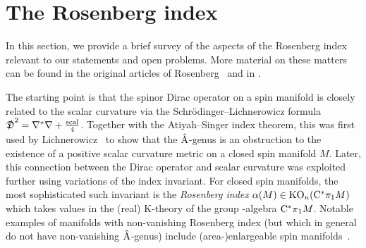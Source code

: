 \documentclass[11pt]{article}
\numberwithin{equation}{section}
\begin{document}
\setcounter{section}{1}
\setcounter{subsection}{0}
\setcounter{subsubsection}{0}
\setcounter{Theorem}{6}
\setcounter{equation}{1}
\section{The Rosenberg index} \label{sec:Rosenberg-index}
In this section, we provide a brief survey of the aspects of the Rosenberg index relevant to our statements and open problems.
More material on these matters can be found in the original articles of Rosenberg~\cite{Rosenberg:PSCNovikovI,Rosenberg:PSCNovikovII,Rosenberg:PSCNovikovIII} and in \cite{RosenbergStolz:PSCSurgeryConnections,Schick:ICM,Stolz:ManifoldsOfPSC,Stolz98Concordance}.

The starting point is that the spinor Dirac operator on a spin manifold is closely related to the scalar curvature via the Schr\"odinger--Lichnerowicz formula \(\slashed{\mathfrak{D}}^2 = \nabla^\ast \nabla + \frac{\operatorname{scal}}{4}\).
Together with the Atiyah--Singer index theorem, this was first used by Lichnerowicz~\cite{Lichnerwociz:Spineurs} to show that the \(\hat{\mathrm{A}}\)-genus is an obstruction to the existence of a positive scalar curvature metric on a closed spin manifold \(M\).
Later, this connection between the Dirac operator and scalar curvature was exploited further using variations of the index invariant.
For closed spin manifolds, the most sophisticated such invariant is the \emph{Rosenberg index} \(\alpha(M) \in \operatorname{KO}_n(\mathrm{C}^\ast \pi_1 M)\) which takes values in the (real) K-theory of the group \textCstar-algebra \(\mathrm{C}^\ast \pi_1 M\).
Notable examples of manifolds with non-vanishing Rosenberg index (but which in general do not have non-vanishing \(\hat{\mathrm{A}}\)-genus) include (area-)enlargeable spin manifolds~\cite{Hanke-Kotschick-Roe-Schick:Coarse-Top-Enlargeability, HankeSchick:Enlargeable,HankeSchick:EnlargeableInfinite}.
\end{document}
